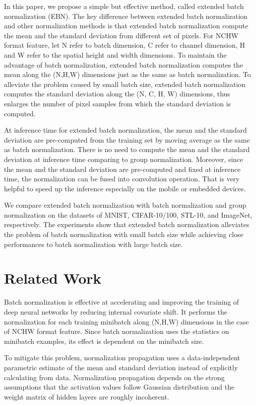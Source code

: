 \documentclass[runningheads]{llncs}
\begin{document}
In this paper, we propose a simple  but effective method, called extended batch normalization (EBN). The key difference between extended batch normalization and other normalization methods is that extended batch normalization compute the mean and the standard deviation from different set of pixels. 
For NCHW format feature, let N refer to batch dimension, C refer to channel dimension, H and W refer to the spatial height and width dimensions.
To maintain the advantage of batch normalization, extended batch normalization computes the mean along the (N,H,W) dimensions just as the same as batch normalization. To alleviate the problem caused by small batch size, extended batch normalization computes the standard deviation along the (N, C, H, W) dimensions, thus enlarges the number of pixel samples from which the standard deviation is computed.

At inference time for extended batch normalization, the mean and the standard deviation are pre-computed
from the training set by moving average as the same as batch normalization. There is no need to compute the mean and the standard deviation at inference time comparing to group normalization.  Moreover, since the mean and the standard deviation are pre-computed and fixed at inference time, the normalization can be fused into convolution operation. That is very helpful to speed up the inference especially on the mobile or embedded devices.

We compare extended batch normalization with batch normalization and group normalization on the datasets of MNIST, CIFAR-10/100, STL-10, and ImageNet, respectively. The experiments show that extended batch normalization alleviates the problem of batch normalization with small batch size while achieving close performances to batch normalization with large batch size.


\section{Related Work}

Batch normalization \cite{ioffe2015batch} is effective at accelerating and
improving the training of deep neural networks by reducing internal covariate shift. It performs the normalization for each training minibatch along (N,H,W) dimensions in the case of NCHW format feature. Since batch normalization uses the statistics on minibatch examples, its effect is dependent on the minibatch size. 

To mitigate this problem, normalization propagation \cite{arpit2016normalization} uses a data-independent parametric estimate of the mean and standard deviation instead of explicitly calculating from data. Normalization propagation depends on the strong assumptions that the activation values follow Gaussian distribution and the weight matrix of hidden layers are roughly incoherent. 
\end{document}
